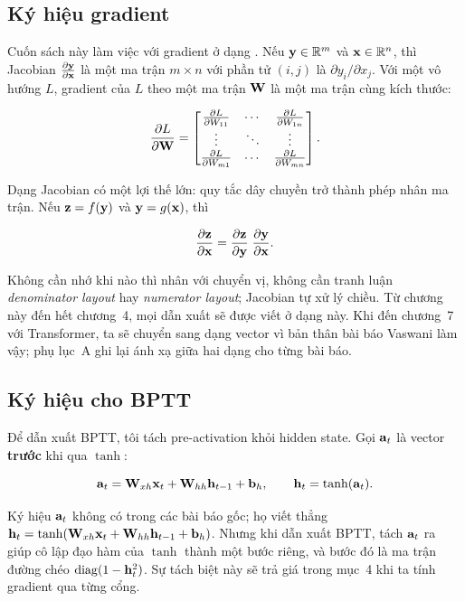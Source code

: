 \subsection{Ký hiệu gradient}

Cuốn sách này làm việc với gradient ở dạng
. Nếu
$\mathbf{y} \in \mathbb{R}^m$ và $\mathbf{x} \in \mathbb{R}^n$, thì Jacobian
$\frac{\partial \mathbf{y}}{\partial \mathbf{x}}$ là một ma trận $m \times n$ với phần tử
$(i,j)$ là $\partial y_i / \partial x_j$. Với một  vô hướng $L$, gradient của $L$ theo một ma trận $\mathbf{W}$ là một
ma trận cùng kích thước:

\[
  \frac{\partial L}{\partial \mathbf{W}} = \begin{bmatrix}
    \frac{\partial L}{\partial W_{11}} & \cdots & \frac{\partial L}{\partial W_{1n}} \\
    \vdots & \ddots & \vdots \\
    \frac{\partial L}{\partial W_{m1}} & \cdots & \frac{\partial L}{\partial W_{mn}}
  \end{bmatrix}.
\]

Dạng Jacobian có một lợi thế lớn: quy tắc dây chuyền trở thành phép nhân ma
trận. Nếu $\mathbf{z} = f(\mathbf{y})$ và $\mathbf{y} = g(\mathbf{x})$, thì

\[
  \frac{\partial \mathbf{z}}{\partial \mathbf{x}} = \frac{\partial \mathbf{z}}{\partial \mathbf{y}} \; \frac{\partial \mathbf{y}}{\partial \mathbf{x}}.
\]

Không cần nhớ khi nào thì nhân với chuyển vị, không cần tranh luận
\emph{denominator layout} hay \emph{numerator layout}; Jacobian tự xử lý
chiều. Từ chương này đến hết chương~4, mọi dẫn xuất sẽ được viết ở dạng này.
Khi đến chương~7 với Transformer, ta sẽ chuyển sang dạng vector vì bản thân
bài báo Vaswani làm vậy; phụ lục~A ghi lại ánh xạ giữa hai dạng cho từng bài
báo.

\subsection{Ký hiệu cho BPTT}

Để dẫn xuất BPTT, tôi tách pre-activation khỏi hidden state. Gọi
$\mathbf{a}_t$ là vector \textbf{trước} khi qua $\tanh$:

\begin{equation}
  \mathbf{a}_t = \mathbf{W}_{xh} \mathbf{x}_t
              + \mathbf{W}_{hh} \mathbf{h}_{t-1}
              + \mathbf{b}_h,
  \qquad
  \mathbf{h}_t = \tanh(\mathbf{a}_t).
  \label{eq:rnn-preact}
\end{equation}

Ký hiệu $\mathbf{a}_t$ không có trong các bài báo gốc; họ viết thẳng
$\mathbf{h}_t = \tanh(\mathbf{W}_{xh} \mathbf{x}_t + \mathbf{W}_{hh} \mathbf{h}_{t-1}
+ \mathbf{b}_h)$. Nhưng khi dẫn xuất BPTT, tách $\mathbf{a}_t$ ra giúp cô lập
đạo hàm của $\tanh$ thành một bước riêng, và bước đó là ma trận đường chéo
$\operatorname{diag}(1 - \mathbf{h}_t^2)$. Sự tách biệt này sẽ trả giá trong mục~4 khi ta
tính gradient qua từng cổng.
